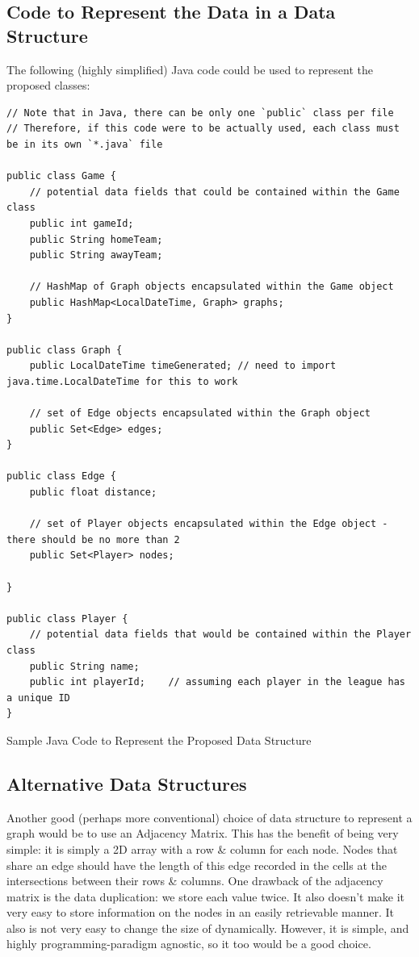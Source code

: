 \documentclass[a4paper,11pt]{article}
\newenvironment{code}{\captionsetup{type=listing}}{}
\begin{document}
\subsection{Code to Represent the Data in a Data Structure}
The following (highly simplified) Java code could be used to represent the proposed classes:
\begin{code}
\begin{verbatim}
// Note that in Java, there can be only one `public` class per file
// Therefore, if this code were to be actually used, each class must be in its own `*.java` file

public class Game {
    // potential data fields that could be contained within the Game class
    public int gameId;
    public String homeTeam;
    public String awayTeam;

    // HashMap of Graph objects encapsulated within the Game object
    public HashMap<LocalDateTime, Graph> graphs;
}

public class Graph {
    public LocalDateTime timeGenerated; // need to import java.time.LocalDateTime for this to work 

    // set of Edge objects encapsulated within the Graph object
    public Set<Edge> edges;
}

public class Edge {
    public float distance;

    // set of Player objects encapsulated within the Edge object - there should be no more than 2
    public Set<Player> nodes;
    
}

public class Player {
    // potential data fields that would be contained within the Player class
    public String name;
    public int playerId;    // assuming each player in the league has a unique ID
}
\end{verbatim}
\caption{Sample Java Code to Represent the Proposed Data Structure}
\end{code}

\subsection{Alternative Data Structures}
Another good (perhaps more conventional) choice of data structure to represent a graph would be to use an Adjacency Matrix.
This has the benefit of being very simple: it is simply a 2D array with a row \& column for each node. 
Nodes that share an edge should have the length of this edge recorded in the cells at the intersections between their rows \& columns.
One drawback of the adjacency matrix is the data duplication: we store each value twice.
It also doesn't make it very easy to store information on the nodes in an easily retrievable manner. 
It also is not very easy to change the size of dynamically.
However, it is simple, and highly programming-paradigm agnostic, so it too would be a good choice.
\end{document}

